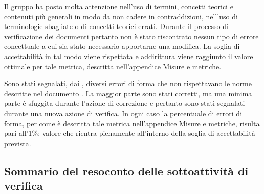 \documentclass[a4paper, titlepage]{article}
\begin{document}
Il gruppo ha posto molta attenzione nell'uso di termini, concetti teorici e contenuti più generali in modo da non cadere in contraddizioni, nell'uso di terminologie sbagliate o di concetti teorici errati. Durante il processo di verificazione dei documenti pertanto non è stato riscontrato nessun tipo di errore concettuale a cui sia stato necessario apportarne una modifica. 
\newline La soglia di accettabilità in tal modo viene rispettata e addirittura viene raggiunto il valore ottimale per tale metrica, descritta nell'appendice \hyperref[sec:metr]{Misure e metriche}.

Sono stati segnalati, dai , diversi errori di forma che non rispettavano le norme descritte nel documento . La maggior parte sono stati corretti, ma una minima parte è sfuggita durante l'azione di correzione e pertanto sono stati segnalati durante una nuova azione di verifica.
\newline In ogni caso la percentuale di errori di forma, per come è descritta tale metrica nell'appendice \hyperref[sec:metr]{Misure e metriche}, risulta pari all'1\%; valore che rientra pienamente all'interno della soglia di accettabilità prevista.
\newpage
\subsection {Sommario del resoconto delle sottoattività di verifica}
\end{document}
